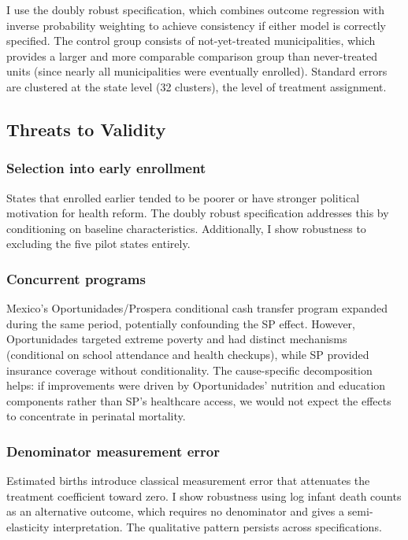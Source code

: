 \documentclass[12pt]{article}
\begin{document}
I use the doubly robust specification, which combines outcome regression with inverse probability weighting to achieve consistency if either model is correctly specified. The control group consists of not-yet-treated municipalities, which provides a larger and more comparable comparison group than never-treated units (since nearly all municipalities were eventually enrolled). Standard errors are clustered at the state level (32 clusters), the level of treatment assignment.

\subsection{Threats to Validity}

\subsubsection*{Selection into early enrollment} States that enrolled earlier tended to be poorer or have stronger political motivation for health reform. The doubly robust specification addresses this by conditioning on baseline characteristics. Additionally, I show robustness to excluding the five pilot states entirely.

\subsubsection*{Concurrent programs} Mexico's Oportunidades/Prospera conditional cash transfer program expanded during the same period, potentially confounding the SP effect. However, Oportunidades targeted extreme poverty and had distinct mechanisms (conditional on school attendance and health checkups), while SP provided insurance coverage without conditionality. The cause-specific decomposition helps: if improvements were driven by Oportunidades' nutrition and education components rather than SP's healthcare access, we would not expect the effects to concentrate in perinatal mortality.

\subsubsection*{Denominator measurement error} Estimated births introduce classical measurement error that attenuates the treatment coefficient toward zero. I show robustness using log infant death counts as an alternative outcome, which requires no denominator and gives a semi-elasticity interpretation. The qualitative pattern persists across specifications.
\end{document}
